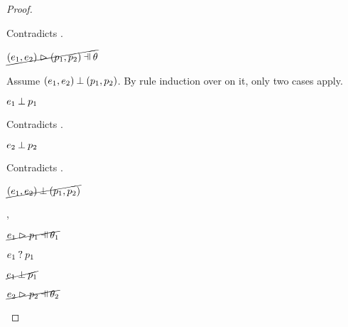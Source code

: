 \begin{proof}
\begin{byCases}
\begin{byCases}
\begin{byCases}
\begin{byCases}
\begin{pfsteps*}
                \end{pfsteps*}
                Contradicts .
            \end{byCases}
            \begin{pfsteps*}
            \item $\cancel{\hpatmatch{\hpair{e_1}{e_2}}{\hpair{p_1}{p_2}}{\theta}}$ 
            \end{pfsteps*}
            Assume $(e_1 , e_2) \mathbin{\bot} (p_1 , p_2)$. By rule induction over  on it, only two cases apply.
            \begin{byCases}
            \item[\text{(\ref{rule:NMPairL})}]
                \begin{pfsteps*}
                \item $e_1 \mathbin{\bot} p_1$ 
                \end{pfsteps*}
                Contradicts .
            \item[\text{(\ref{rule:NMPairR})}]
                \begin{pfsteps*}
                \item $e_2 \mathbin{\bot} p_2$ 
                \end{pfsteps*}
                Contradicts .
            \end{byCases}
            \begin{pfsteps*}
            \item $\cancel{(e_1 , e_2) \mathbin{\bot} (p_1 , p_2)}$ 
            \end{pfsteps*}
        \item[\hmaymatch{e_1}{p_1},\hmaymatch{e_2}{p_2}]
            \begin{pfsteps*}
            \item $\cancel{\hpatmatch{e_1}{p_1}{\theta_1}}$  
            \item $e_1 \mathbin{?} p_1$  
            \item $\cancel{e_1 \mathbin{\bot} p_1}$  
            \item $\cancel{\hpatmatch{e_2}{p_2}{\theta_2}}$  

\end{pfsteps*}
\end{byCases}
\end{byCases}
\end{byCases}
\end{proof}

